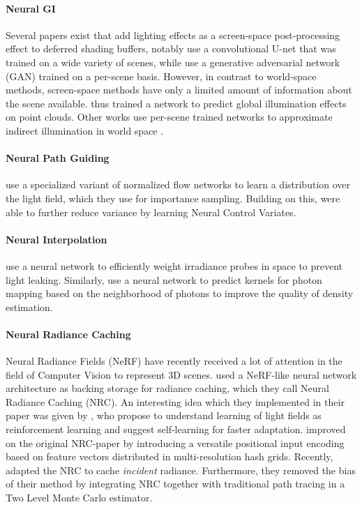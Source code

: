 \paragraph{Neural GI}
Several papers exist that add lighting effects as a screen-space post-processing effect to deferred shading buffers, notably \textcite{nalbach2017} use a convolutional U-net that was trained on a wide variety of scenes, while \textcite{thomas2018} use a generative adversarial network (GAN) trained on a per-scene basis.
However, in contrast to world-space methods, screen-space methods have only a limited amount of information about the scene available.
\textcite{hermosilla2019} thus trained a network to predict global illumination effects on point clouds.
Other works use per-scene trained networks to approximate indirect illumination in world space .

\paragraph{Neural Path Guiding}
\textcite{muller2019} use a specialized variant of normalized flow networks to learn a distribution over the light field, which they use for importance sampling.
Building on this, \textcite{muller2020} were able to further reduce variance by learning Neural Control Variates.

\paragraph{Neural Interpolation}
\textcite{iwanicki2017} use a neural network to efficiently weight irradiance probes in space to prevent light leaking.
Similarly, \textcite{zhu2020} use a neural network to predict kernels for photon mapping based on the neighborhood of photons to improve the quality of density estimation.

\paragraph{Neural Radiance Caching}
Neural Radiance Fields (NeRF)  have recently received a lot of attention in the field of Computer Vision to represent 3D scenes.
\textcite{muller2021} used a NeRF-like neural network architecture as backing storage for radiance caching, which they call Neural Radiance Caching (NRC).
An interesting idea which they implemented in their paper was given by \textcite{dahm2017}, who propose to understand learning of light fields as reinforcement learning and suggest self-learning for faster adaptation.
\textcite{muller2022} improved on the original NRC-paper by introducing a versatile positional input encoding based on feature vectors distributed in multi-resolution hash grids.
Recently, \textcite{dereviannykh2024} adapted the NRC to cache \textit{incident} radiance.
Furthermore, they removed the bias of their method by integrating NRC together with traditional path tracing in a Two Level Monte Carlo estimator.

